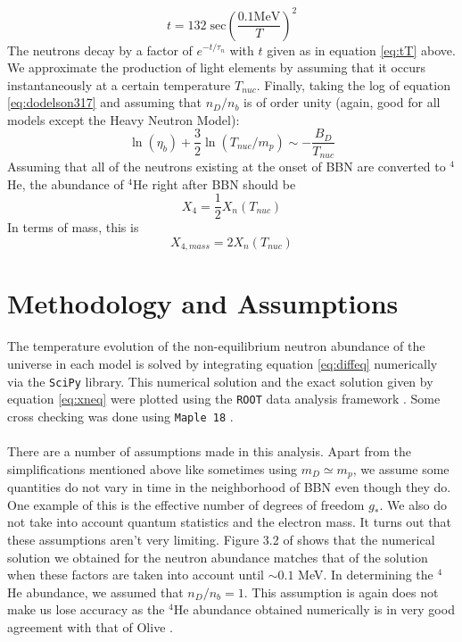 \documentclass[aps,reprint,prl]{revtex4-1}
\begin{document}
\begin{equation} \label{eq:tT}
t=132\;\mathrm{sec}\left(\frac{0.1\mathrm{MeV}}{T}\right)^2
\end{equation}
The neutrons decay by a factor of $e^{-t/\tau_n}$ with $t$ given as in equation \ref{eq:tT} above.  We approximate the production of light elements by assuming that it occurs instantaneously at a certain temperature $T_{nuc}$.    Finally, taking the log of equation \ref{eq:dodelson317} and assuming that $n_D/n_b$ is of order unity (again, good for all models except the Heavy Neutron Model):
\begin{equation}
\ln(\eta_b)+\frac{3}{2}\ln(T_{nuc}/m_p)\sim-\frac{B_D}{T_{nuc}}
\end{equation}
Assuming that all of the neutrons existing at the onset of BBN are converted to $^4$He, the abundance of $^4$He right after BBN should be
\begin{equation} \label{eq:abund}
X_4=\frac{1}{2}X_n(T_{nuc})
\end{equation}
In terms of mass, this is
\begin{equation} \label{eq:mass}
X_{4,mass}=2X_n(T_{nuc})
\end{equation}
\section*{Methodology and Assumptions}
The temperature evolution of the non-equilibrium neutron abundance of the universe in each model is solved by integrating equation \ref{eq:diffeq} numerically via the \texttt{SciPy} \cite{scipy} library.  This numerical solution and the exact solution given by equation \ref{eq:xneq} were plotted using the \texttt{ROOT} data analysis framework \cite{ROOT}.  Some cross checking was done using \texttt{Maple 18} \cite{maple}.
\\ \\
There are a number of assumptions made in this analysis.  Apart from the simplifications mentioned above like sometimes using $m_D\simeq m_p$, we assume some quantities do not vary in time in the neighborhood of BBN even though they do.  One example of this is the effective number of degrees of freedom $g_*$.  We also do not take into account quantum statistics and the electron mass.  It turns out that these assumptions aren't very limiting.  Figure 3.2 of \cite{Dodelson} shows that the numerical solution we obtained for the neutron abundance matches that of the solution when these factors are taken into account until $\sim0.1$ MeV.  In determining the $^4$He abundance, we assumed that $n_D/n_b=1$.  This assumption is again does not make us lose accuracy as the $^4$He abundance obtained numerically is in very good agreement with that of Olive \cite{olive}.
\end{document}
